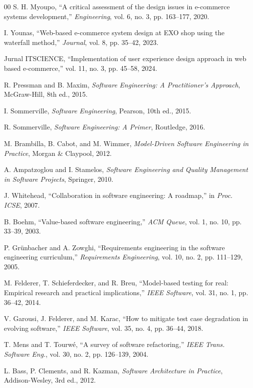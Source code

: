 \documentclass[conference]{IEEEtran}
\begin{document}
\begin{thebibliography}{00}
 S. H. Myoupo, ``A critical assessment of the design issues in e-commerce systems development,'' \textit{Engineering}, vol. 6, no. 3, pp. 163--177, 2020.

 I. Younas, ``Web-based e-commerce system design at EXO shop using the waterfall method,'' \textit{Journal}, vol. 8, pp. 35--42, 2023.

 Jurnal ITSCIENCE, ``Implementation of user experience design approach in web based e-commerce,'' vol. 11, no. 3, pp. 45--58, 2024.

 R. Pressman and B. Maxim, \textit{Software Engineering: A Practitioner's Approach}, McGraw-Hill, 8th ed., 2015.

 I. Sommerville, \textit{Software Engineering}, Pearson, 10th ed., 2015.

 R. Sommerville, \textit{Software Engineering: A Primer}, Routledge, 2016.

 M. Brambilla, B. Cabot, and M. Wimmer, \textit{Model-Driven Software Engineering in Practice}, Morgan \& Claypool, 2012.

 A. Ampatzoglou and I. Stamelos, \textit{Software Engineering and Quality Management in Software Projects}, Springer, 2010.

 J. Whitehead, ``Collaboration in software engineering: A roadmap,'' in \textit{Proc. ICSE}, 2007.

 B. Boehm, ``Value-based software engineering,'' \textit{ACM Queue}, vol. 1, no. 10, pp. 33--39, 2003.

 P. Grünbacher and A. Zowghi, ``Requirements engineering in the software engineering curriculum,'' \textit{Requirements Engineering}, vol. 10, no. 2, pp. 111--129, 2005.

 M. Felderer, T. Schieferdecker, and R. Breu, ``Model-based testing for real: Empirical research and practical implications,'' \textit{IEEE Software}, vol. 31, no. 1, pp. 36--42, 2014.

 V. Garousi, J. Felderer, and M. Karac, ``How to mitigate test case degradation in evolving software,'' \textit{IEEE Software}, vol. 35, no. 4, pp. 36--44, 2018.

 T. Mens and T. Tourwé, ``A survey of software refactoring,'' \textit{IEEE Trans. Software Eng.}, vol. 30, no. 2, pp. 126--139, 2004.

 L. Bass, P. Clements, and R. Kazman, \textit{Software Architecture in Practice}, Addison-Wesley, 3rd ed., 2012.


\end{thebibliography}
\end{document}
